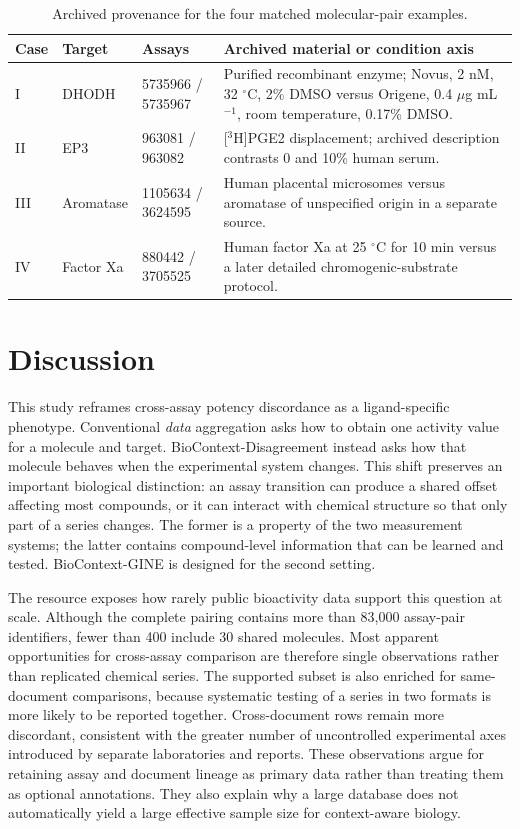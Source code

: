 \documentclass[letterpaper]{article}
\begin{document}
\begin{table}[t]
\centering
\caption{Archived provenance for the four matched molecular-pair examples.}
\label{tab:caseprovenance}
\small
\renewcommand{\arraystretch}{1.16}
\begin{tabular}{@{}p{0.42in}p{0.78in}p{1.28in}p{3.72in}@{}}
\toprule
Case & Target & Assays & Archived material or condition axis \\
\midrule
I & DHODH & 5735966 / 5735967 & Purified recombinant enzyme; Novus, 2 nM, 32 $^\circ$C, 2\% DMSO versus Origene, 0.4 $\mu$g mL$^{-1}$, room temperature, 0.17\% DMSO. \\
II & EP3 & 963081 / 963082 & [$^3$H]PGE2 displacement; archived description contrasts 0 and 10\% human serum. \\
III & Aromatase & 1105634 / 3624595 & Human placental microsomes versus aromatase of unspecified origin in a separate source. \\
IV & Factor Xa & 880442 / 3705525 & Human factor Xa at 25 $^\circ$C for 10 min versus a later detailed chromogenic-substrate protocol. \\
\bottomrule
\end{tabular}
\renewcommand{\arraystretch}{1}
\end{table}

\section{Discussion}

This study reframes cross-assay potency discordance as a ligand-specific phenotype. Conventional \emph{data} aggregation asks how to obtain one activity value for a molecule and target. BioContext-Disagreement instead asks how that molecule behaves when the experimental system changes. This shift preserves an important biological distinction: an assay transition can produce a shared offset affecting most compounds, or it can interact with chemical structure so that only part of a series changes. The former is a property of the two measurement systems; the latter contains compound-level information that can be learned and tested. BioContext-GINE is designed for the second setting.

The resource exposes how rarely public bioactivity data support this question at scale. Although the complete pairing contains more than 83,000 assay-pair identifiers, fewer than 400 include 30 shared molecules. Most apparent opportunities for cross-assay comparison are therefore single observations rather than replicated chemical series. The supported subset is also enriched for same-document comparisons, because systematic testing of a series in two formats is more likely to be reported together. Cross-document rows remain more discordant, consistent with the greater number of uncontrolled experimental axes introduced by separate laboratories and reports. These observations argue for retaining assay and document lineage as primary data rather than treating them as optional annotations. They also explain why a large database does not automatically yield a large effective sample size for context-aware biology.
\end{document}
